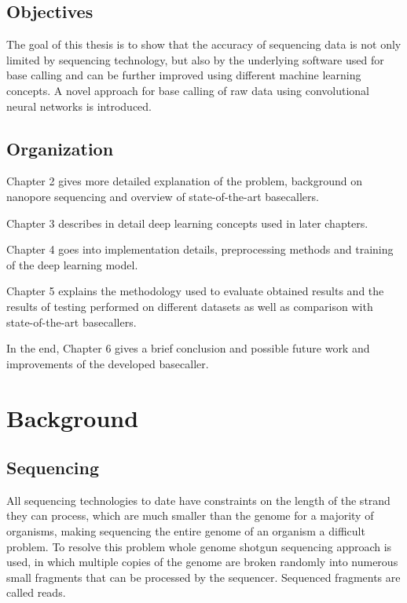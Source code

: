 \documentclass[times, utf8, diplomski, numeric, english]{fer}
\begin{document}
\section{Objectives}
The goal of this thesis is to show that the accuracy of sequencing data is not only limited by sequencing technology, but also by the underlying software used for base calling and can be further improved using different machine learning concepts. A novel approach for base calling of raw data using convolutional neural networks is introduced.

\section{Organization}
\indent Chapter 2 gives more detailed explanation of the problem, background on nanopore sequencing and overview of state-of-the-art basecallers.

Chapter 3 describes in detail deep learning concepts used in later chapters.

Chapter 4 goes into implementation details, preprocessing methods and training of the deep learning model. 

Chapter 5 explains the methodology used to evaluate obtained results and the results of testing performed on different datasets as well as comparison with state-of-the-art basecallers.

In the end, Chapter 6 gives a brief conclusion and possible future work and improvements of the developed basecaller.

\chapter{Background}

\section{Sequencing}

All sequencing technologies to date have constraints on the length of the strand they can process, which are much smaller than the genome for a majority of organisms, making sequencing the entire genome of an organism a difficult problem. To resolve this problem whole genome shotgun sequencing approach is used, in which multiple copies of the genome are broken randomly into numerous small fragments that can be processed by the sequencer. Sequenced fragments are called reads.
\end{document}
